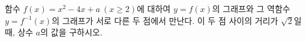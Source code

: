 함수 $f(x)=x^2-4x+a\ (x\ge 2)$에 대하여 $y=f(x)$의 그래프와 그 역함수 $y=f^{-1}(x)$의 그래프가 서로 다른 두 점에서 만난다. 이 두 점 사이의 거리가 $\sqrt{2}$일 때, 상수 $a$의 값을 구하시오.
